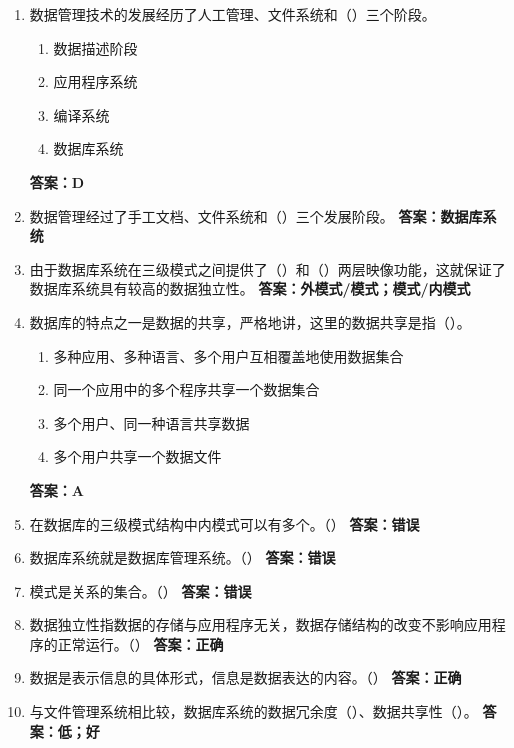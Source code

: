 \documentclass[12pt, a4paper]{article}
\begin{document}
\begin{enumerate}[label=\arabic*.]
	\item 数据管理技术的发展经历了人工管理、文件系统和（\quad）三个阶段。
	      \begin{enumerate}
		      \item 数据描述阶段
		      \item 应用程序系统
		      \item 编译系统
		      \item 数据库系统
	      \end{enumerate}
	      \textbf{答案：D}

	\item 数据管理经过了手工文档、文件系统和（\quad）三个发展阶段。
	      \textbf{答案：数据库系统}

	\item 由于数据库系统在三级模式之间提供了（\quad）和（\quad）两层映像功能，这就保证了数据库系统具有较高的数据独立性。
	      \textbf{答案：外模式/模式；模式/内模式}

	\item 数据库的特点之一是数据的共享，严格地讲，这里的数据共享是指（\quad）。
	      \begin{enumerate}
		      \item 多种应用、多种语言、多个用户互相覆盖地使用数据集合
		      \item 同一个应用中的多个程序共享一个数据集合
		      \item 多个用户、同一种语言共享数据
		      \item 多个用户共享一个数据文件
	      \end{enumerate}
	      \textbf{答案：A}

	\item 在数据库的三级模式结构中内模式可以有多个。（\quad）
	      \textbf{答案：错误}

	\item 数据库系统就是数据库管理系统。（\quad）
	      \textbf{答案：错误}

	\item 模式是关系的集合。（\quad）
	      \textbf{答案：错误}

	\item 数据独立性指数据的存储与应用程序无关，数据存储结构的改变不影响应用程序的正常运行。（\quad）
	      \textbf{答案：正确}

	\item 数据是表示信息的具体形式，信息是数据表达的内容。（\quad）
	      \textbf{答案：正确}

	\item 与文件管理系统相比较，数据库系统的数据冗余度（\quad）、数据共享性（\quad）。
	      \textbf{答案：低；好}


\end{enumerate}
\end{document}
